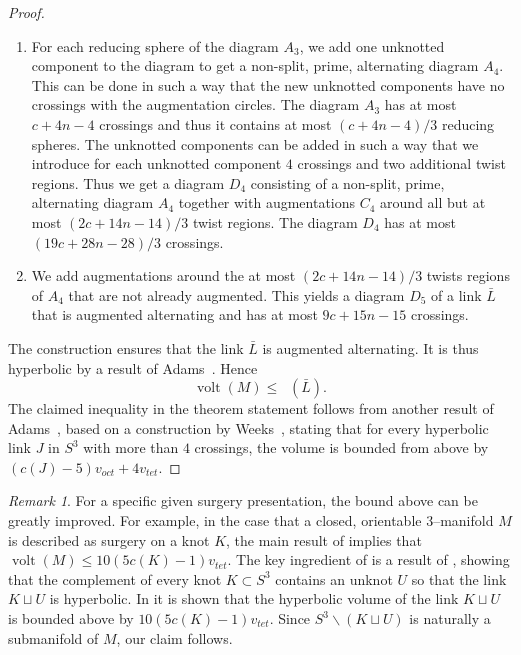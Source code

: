 \documentclass[a4paper]{gtart}
\theoremstyle{definition}
\theoremstyle{remark}
\newtheorem{remark}[proposition]{Remark}
\numberwithin{equation}{section}
\DeclareMathOperator{\volt}{volt}
\DeclareMathOperator{\volh}{vol_{\mathbb{H}}}
\begin{document}
\begin{proof}
\begin{enumerate}
		\item For each reducing sphere of the diagram $A_3$, we add one unknotted component to the diagram to get a non-split, prime, alternating diagram $A_4$. This can be done in such a way that the new unknotted components have no crossings with the augmentation circles. The diagram $A_3$ has at most $c+4n-4$ crossings and thus it contains at most $(c+4n-4)/3$ reducing spheres. The unknotted components can be added in such a way that we introduce for each unknotted component $4$ crossings and two additional twist regions. Thus we get a diagram $D_4$ consisting of a non-split, prime, alternating diagram $A_4$ together with augmentations $C_4$ around all but at most $(2c+14n-14)/3$ twist regions. The diagram $D_4$ has at most $(19c+28n-28)/3$ crossings.
		
		\item We add augmentations around the at most $(2c+14n-14)/3$ twists regions of $A_4$ that are not already augmented. This yields a diagram $D_5$ of a link $\bar L$ that is augmented alternating and has at most $9c+15n-15$ crossings.
		
	\end{enumerate}
	The construction ensures that the link $\bar L$ is augmented alternating. It is thus hyperbolic by a result of Adams~\cite{Adams_Augmented}. Hence    \begin{equation*}
		\volt(M)\leq\volh(\bar L).
	\end{equation*}
	The claimed inequality in the theorem statement follows from another result of Adams~\cite{Adams_Bound}, based on a construction by Weeks~\cite[Section 3]{handbookknottheory}, stating that for every hyperbolic link $J$ in $S^3$ with more than $4$ crossings, the volume is bounded from above by $(c(J)-5)v_{oct}+4v_{tet}$.
\end{proof}

\begin{remark}
For a specific given surgery presentation, the bound above can be greatly improved. For example, in the case that a closed, orientable 3--manifold $M$ is described as surgery on a knot $K$, the main result of \cite{BAR-altvolume} implies that $\volt(M)\leq 10(5c(K)-1)v_{tet}$. The key ingredient of \cite{BAR-altvolume} is a result of \cite{Blair-altaug}, showing that the complement of every knot $K\subset S^3$ contains an unknot $U$ so that the link $K\sqcup U$ is hyperbolic. In \cite{BAR-altvolume} it is shown that the hyperbolic volume of the link $K\sqcup U$ is bounded above by $10(5c(K)-1)v_{tet}$. Since $S^3\smallsetminus (K\sqcup U)$ is naturally a submanifold of $M$, our claim follows.
\end{remark}
\end{document}
